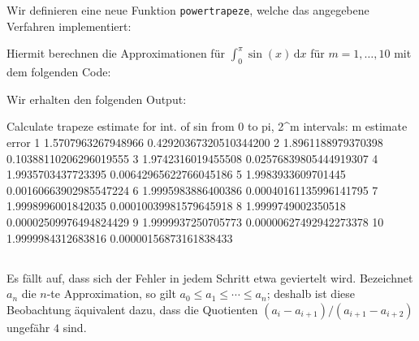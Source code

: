 \section{}
\label{section: better trapeze}





\subsection{}

Wir definieren eine neue Funktion \texttt{powertrapeze}, welche das angegebene Verfahren implementiert:



Hiermit berechnen die Approximationen für $\int_0^\pi \sin(x) \,\text{d}x$ für $m = 1, \dotsc, 10$ mit dem folgenden Code:



Wir erhalten den folgenden Output:
\begin{consoleoutput}
Calculate trapeze estimate for int. of sin from 0 to pi, 2^m intervals:
 m      estimate                error
 1      1.5707963267948966      0.42920367320510344200
 2      1.8961188979370398      0.10388110206296019555
 3      1.9742316019455508      0.02576839805444919307
 4      1.9935703437723395      0.00642965622766045186
 5      1.9983933609701445      0.00160663902985547224
 6      1.9995983886400386      0.00040161135996141795
 7      1.9998996001842035      0.00010039981579645918
 8      1.9999749002350518      0.00002509976494824429
 9      1.9999937250705773      0.00000627492942273378
10      1.9999984312683816      0.00000156873161838433
\end{consoleoutput}





\subsection{}

Es fällt auf, dass sich der Fehler in jedem Schritt etwa geviertelt wird.
Bezeichnet $a_n$ die $n$-te Approximation, so gilt $a_0 \leq a_1 \leq \dotsb \leq a_n$; deshalb ist diese Beobachtung äquivalent dazu, dass die Quotienten $(a_i - a_{i+1})/(a_{i+1} - a_{i+2})$ ungefähr $4$ sind.

